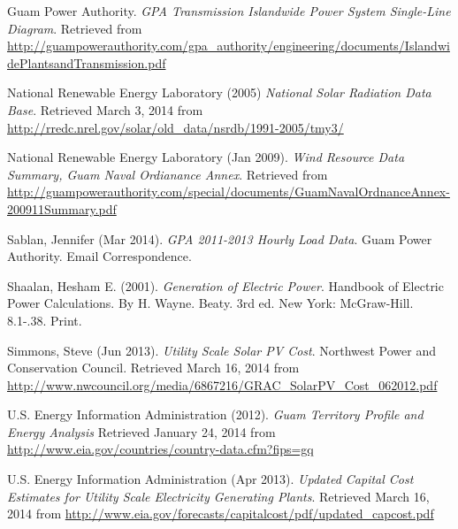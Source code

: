 \documentclass[12pt,letterpaper,fleqn]{article}
\begin{document}
\begin{thebibliography}{99}
  Guam Power Authority.
  \emph{GPA Transmission Islandwide Power System Single-Line Diagram}.
  Retrieved from 
  \url{http://guampowerauthority.com/gpa_authority/engineering/documents/IslandwidePlantsandTransmission.pdf}

  National Renewable Energy Laboratory (2005)
  \emph{National Solar Radiation Data Base}.
  Retrieved March 3, 2014 from
  \url{http://rredc.nrel.gov/solar/old_data/nsrdb/1991-2005/tmy3/}

  National Renewable Energy Laboratory (Jan 2009).
  \emph{Wind Resource Data Summary, Guam Naval Ordianance Annex}.
  Retrieved from
  \url{http://guampowerauthority.com/special/documents/GuamNavalOrdnanceAnnex-200911Summary.pdf}

  Sablan, Jennifer (Mar 2014).
  \emph{GPA 2011-2013 Hourly Load Data}.
  Guam Power Authority.
  Email Correspondence.

  Shaalan, Hesham E. (2001).
  \emph{Generation of Electric Power}.
  Handbook of Electric Power Calculations.
  By H. Wayne. Beaty.
  3rd ed. New York: McGraw-Hill.
  8.1-.38.
  Print.

  Simmons, Steve (Jun 2013).
  \emph{Utility Scale Solar PV Cost}.
  Northwest Power and Conservation Council.
  Retrieved March 16, 2014 from
  \url{http://www.nwcouncil.org/media/6867216/GRAC_SolarPV_Cost_062012.pdf}

  U.S. Energy Information Administration (2012).
  \emph{Guam Territory Profile and Energy Analysis}
  Retrieved January 24, 2014 from
  \url{http://www.eia.gov/countries/country-data.cfm?fips=gq}

  U.S. Energy Information Administration (Apr 2013).
  \emph{Updated Capital Cost Estimates for Utility Scale Electricity
    Generating Plants}.
  Retrieved March 16, 2014 from
  \url{http://www.eia.gov/forecasts/capitalcost/pdf/updated_capcost.pdf}

\end{thebibliography}
\end{document}
